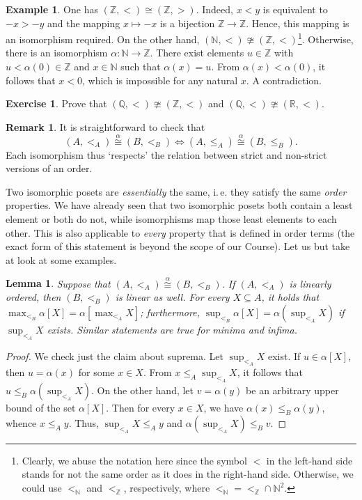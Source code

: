 \documentclass[12pt,notitlepage]{article}
\theoremstyle{plain}
\newtheorem{lemma}[thm]{Lemma}
\theoremstyle{definition}
\newtheorem{exc}[thm]{Exercise}
\newtheorem{exm}[thm]{Example}
\newtheorem{rem}[thm]{Remark}
\theoremstyle{plain}
\newcommand{\N}{\mathbb{N}}
\newcommand{\Z}{\mathbb{Z}}
\newcommand{\Q}{\mathbb{Q}}
\newcommand{\R}{\mathbb{R}}
\newcommand{\sbs}{\subseteq}
\newcommand{\1}{\mathbf{1}}
\newcommand{\0}{\mathbf{0}}
\begin{document}
\begin{exm}
One has $(\Z, <) \cong (\Z, >)$. Indeed, $x < y$ is equivalent to $-x > -y$ and the mapping $x \mapsto -x$ is a bijection $\Z \to \Z$. Hence, this mapping is an isomorphism required. On the other hand, $(\N, <) \ncong (\Z, <)$\;\footnote{Clearly, we abuse the notation here since the symbol ${<}$ in the left-hand side stands for not the same order as it does in the right-hand side. Otherwise, we could use $<_{\N}$ and $<_{\Z}$, respectively, where ${<_{\N}} = {<_{\Z}} \cap \N^2$.}. Otherwise, there is an isomorphism $\alpha\colon \N \to \Z$. There exist elements $u \in \Z$ with $u < \alpha(0) \in \Z$ and $x \in \N$ such that $\alpha(x) = u$. From $\alpha(x) < \alpha(0)$, it follows that $x < 0$, which is impossible for any natural $x$. A contradiction.
\end{exm}
\begin{exc}
Prove that $(\Q, <) \ncong (\Z, <)$ and $(\Q, <) \ncong (\R, <)$.
\end{exc}

\begin{rem}
It is straightforward to check that
$$(A, <_A) \stackrel{\alpha}{\cong} (B, <_B) \iff (A, \leq_A) \stackrel{\alpha}{\cong} (B, \leq_B).$$
Each isomorphism thus `respects' the relation between strict and non-strict versions of an order.
\end{rem}

Two isomorphic posets are \emph{essentially} the same, i.\,e. they satisfy the same \emph{order} properties. We have already seen that two isomorphic posets both contain a least element or both do not, while isomorphisms map those least elements to each other. This is also applicable to \emph{every} property that is defined in order terms (the exact form of this statement is beyond the scope of our Course). Let us but take at look at some examples.
\begin{lemma}
Suppose that $(A, <_A) \stackrel{\alpha}{\cong} (B, <_B)$. If $(A, <_A)$ is linearly ordered, then $(B, <_B)$ is linear as well. For every $X \sbs A$, it holds that $\max_{<_B} \alpha[X] = \alpha[ \max_{<_A} X ]$; furthermore, $\sup_{<_B} \alpha[X] = \alpha(\sup_{<_A} X)$ if $\sup_{<_A} X$ exists. Similar statements are true for minima and infima.
\end{lemma}
\begin{proof}
We check just the claim about suprema. Let $\sup_{<_A} X$ exist. If $u \in \alpha[X]$, then $u = \alpha(x)$ for some $x \in X$. From $x \leq_A \sup_{<_A} X$, it follows that $u \leq_B \alpha(\sup_{<_A} X)$. On the other hand, let $v = \alpha(y)$ be an arbitrary upper bound of the set $\alpha[X]$. Then for every $x \in X$, we have $\alpha(x) \leq_B \alpha(y)$, whence $x \leq_A y$. Thus, $\sup_{<_A} X \leq_A y$ and $\alpha(\sup_{<_A} X) \leq_B v$.
\end{proof}
\end{document}
